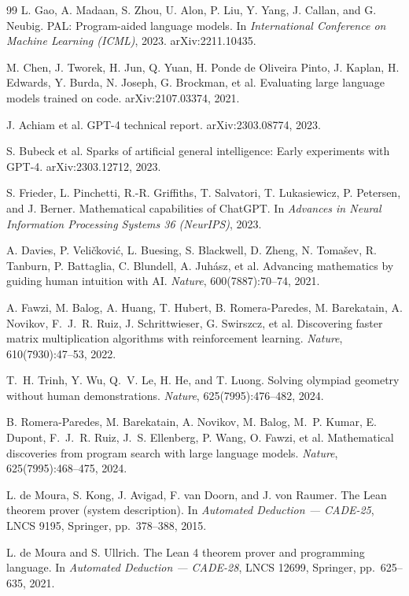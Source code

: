 \documentclass[11pt]{article}
\theoremstyle{definition}
\theoremstyle{plain}
\theoremstyle{remark}
\begin{document}
\begin{thebibliography}{99}
L. Gao, A. Madaan, S. Zhou, U. Alon, P. Liu, Y. Yang, J. Callan, and G. Neubig.
PAL: Program-aided language models.
In \emph{International Conference on Machine Learning (ICML)}, 2023. arXiv:2211.10435.

M. Chen, J. Tworek, H. Jun, Q. Yuan, H. Ponde de Oliveira Pinto, J. Kaplan,
H. Edwards, Y. Burda, N. Joseph, G. Brockman, et al.
Evaluating large language models trained on code.
arXiv:2107.03374, 2021.

J. Achiam et al.
GPT-4 technical report.
arXiv:2303.08774, 2023.

S. Bubeck et al.
Sparks of artificial general intelligence: Early experiments with GPT-4.
arXiv:2303.12712, 2023.

S. Frieder, L. Pinchetti, R.-R. Griffiths, T. Salvatori, T. Lukasiewicz, P. Petersen,
and J. Berner.
Mathematical capabilities of ChatGPT.
In \emph{Advances in Neural Information Processing Systems 36 (NeurIPS)}, 2023.

A. Davies, P. Veli\v{c}kovi\'c, L. Buesing, S. Blackwell, D. Zheng, N. Toma\v{s}ev,
R. Tanburn, P. Battaglia, C. Blundell, A. Juh\'asz, et al.
Advancing mathematics by guiding human intuition with AI.
\emph{Nature}, 600(7887):70--74, 2021.

A. Fawzi, M. Balog, A. Huang, T. Hubert, B. Romera-Paredes, M. Barekatain, A. Novikov,
F.~J.~R. Ruiz, J. Schrittwieser, G. Swirszcz, et al.
Discovering faster matrix multiplication algorithms with reinforcement learning.
\emph{Nature}, 610(7930):47--53, 2022.

T.~H. Trinh, Y. Wu, Q.~V. Le, H. He, and T. Luong.
Solving olympiad geometry without human demonstrations.
\emph{Nature}, 625(7995):476--482, 2024.

B. Romera-Paredes, M. Barekatain, A. Novikov, M. Balog, M.~P. Kumar, E. Dupont,
F.~J.~R. Ruiz, J.~S. Ellenberg, P. Wang, O. Fawzi, et al.
Mathematical discoveries from program search with large language models.
\emph{Nature}, 625(7995):468--475, 2024.

L. de Moura, S. Kong, J. Avigad, F. van Doorn, and J. von Raumer.
The Lean theorem prover (system description).
In \emph{Automated Deduction --- CADE-25}, LNCS 9195, Springer, pp.~378--388, 2015.

L. de Moura and S. Ullrich.
The Lean 4 theorem prover and programming language.
In \emph{Automated Deduction --- CADE-28}, LNCS 12699, Springer, pp.~625--635, 2021.


\end{thebibliography}
\end{document}
